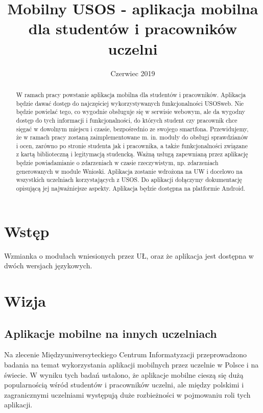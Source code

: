 \documentclass{pracamgr}
\title{Mobilny USOS - aplikacja mobilna dla studentów i pracowników uczelni}
\date{Czerwiec 2019}
\begin{document}
\maketitle
\begin{abstract}
  W ramach pracy powstanie aplikacja mobilna dla
  studentów i pracowników. Aplikacja będzie dawać dostęp do najczęściej wykorzystywanych 
  funkcjonalności USOSweb. Nie będzie powielać tego, co wygodnie obsługuje się w serwisie 
  webowym, ale da wygodny dostęp do tych informacji i funkcjonalności, do których student czy 
  pracownik chce sięgać w dowolnym miejscu i czasie, bezpośrednio ze swojego smartfona. 
  Przewidujemy, że w ramach pracy zostaną zaimplementowane m. in. moduły do obsługi 
  sprawdzianów i ocen, zarówno po stronie studenta jak i pracownika, a także funkcjonalności 
  związane z kartą biblioteczną i legitymacją studencką. Ważną usługą zapewnianą przez 
  aplikację będzie powiadamianie o zdarzeniach w czasie rzeczywistym, np. zdarzeniach 
  generowanych w module Wnioski. Aplikacja zostanie wdrożona na UW i docelowo na 
  wszystkich uczelniach korzystających z USOS. Do aplikacji dołączymy dokumentację opisującą 
  jej najważniejsze aspekty. Aplikacja będzie dostępna na platformie Android.
\end{abstract}

\tableofcontents

\chapter{Wstęp}

Wzmianka o modułach wniesionych przez UŁ, oraz że aplikacja jest dostępna
w dwóch wersjach językowych.


\chapter{Wizja}

\section{Aplikacje mobilne na innych uczelniach}

Na zlecenie Międzyuniwersyteckiego Centrum Informatyzacji przeprowadzono
badania na temat wykorzystania aplikacji mobilnych przez uczelnie w
Polsce i na świecie. W wyniku tych badań ustalono, że aplikacje mobilne
cieszą się dużą popularnością wśród studentów i pracowników uczelni, ale
między polskimi i zagranicznymi uczelniami występują duże rozbieżności w
pojmowaniu roli tych aplikacji.
\end{document}
